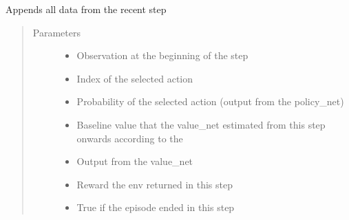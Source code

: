 \documentclass[letterpaper,10pt,english]{sphinxmanual}
\begin{document}
\begin{fulllineitems}
\begin{fulllineitems}
\label{\detokenize{agents.reinforcement_learning:agents.reinforcement_learning.ppo_masked.RolloutBuffer.store_memory}}
\sphinxAtStartPar
Appends all data from the recent step
\begin{quote}\begin{description}
\item[{Parameters}] \leavevmode\begin{itemize}
\item {} 
\sphinxAtStartPar
{} \textendash{} Observation at the beginning of the step

\item {} 
\sphinxAtStartPar
{} \textendash{} Index of the selected action

\item {} 
\sphinxAtStartPar
{} \textendash{} Probability of the selected action (output from the policy\_net)

\item {} 
\sphinxAtStartPar
{} \textendash{} Baseline value that the value\_net estimated from this step onwards according to the

\item {} 
\sphinxAtStartPar
{} \textendash{} Output from the value\_net

\item {} 
\sphinxAtStartPar
{} \textendash{} Reward the env returned in this step

\item {} 
\sphinxAtStartPar
{} \textendash{} True if the episode ended in this step


\end{itemize}
\end{description}
\end{quote}
\end{fulllineitems}
\end{fulllineitems}
\end{document}
